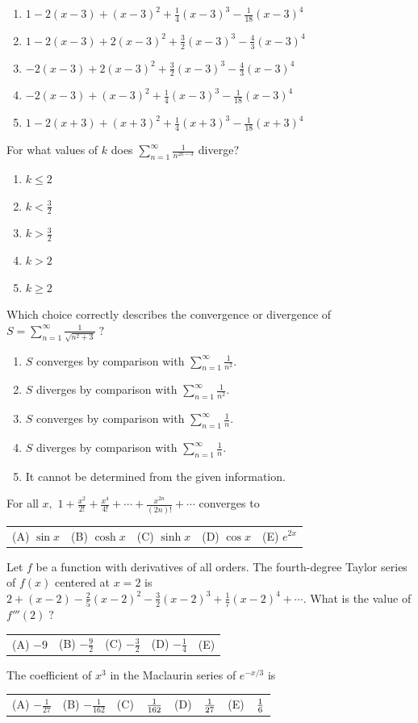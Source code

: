 \documentclass[letterstyle,12pt]{extarticle}
\newcounter{qcounter}
\newcommand{\nspace}{\hspace{2.52mm}}
\newcommand{\choices}[5]{
\vspace{0.8em} 
\begin{enumerate}[label=(\Alph*)]
\setlength\itemsep{1em} 
\item
#1 
\item 
#2
\item
#3
\item
#4
\item
#5
\end{enumerate}
}
\newcommand{\choicesline}[5]{    
\vspace{2em} \break 
\begin{tabularx}{0.95 \textwidth} { 
>{\arraybackslash}X 
>{\arraybackslash}X 
>{\arraybackslash}X 
>{\arraybackslash}X 
>{\arraybackslash}X }
(A) \; #1
& 
(B) \; #2
& 
(C) \; #3
& 
(D) \; #4
&
(E) \; #5 
\end{tabularx}
\vspace{2em} \break
}
\newcommand{\qspace}[1]{\begin{spacing}{1.8}#1\end{spacing}}
\newcommand{\ans}[1]{{\color{black} #1}}
\newenvironment{question}
    {\begin{minipage}{0.9 \textwidth}
        \item
    }
    { 
    \end{minipage} \vspace{4ex}
    }
\begin{document}
\begin{list}{\textbf{.}~}{}
\begin{question}
\choices
{\ans{\(1 -2(x - 3) + (x - 3)^2 + \frac{1}{4} (x - 3)^3 - \frac{1}{18} (x - 3)^4\)}}
{\(1 -2(x - 3) + 2(x - 3)^2 + \frac{3}{2}(x - 3)^3 - \frac{4}{3} (x - 3)^4\)}
{\(-2(x - 3) + 2(x - 3)^2 + \frac{3}{2}(x - 3)^3 - \frac{4}{3} (x - 3)^4\)}
{\(-2(x - 3) + (x - 3)^2 + \frac{1}{4} (x - 3)^3 - \frac{1}{18} (x - 3)^4\)}
{\(1 -2(x + 3) + (x + 3)^2 + \frac{1}{4} (x + 3)^3 - \frac{1}{18} (x + 3)^4\)}
\end{question}

\begin{question}
For what values of \(k\) does \(\sum_{n = 1}^\infty \frac{1}{n^{2k - 3}}\) diverge?
\choices
{\ans{\(k \leqslant 2\)}}
{\(k < \frac{3}{2}\)}
{\(k > \frac{3}{2}\)}
{\(k > 2\)}
{\(k \geqslant 2\)}
\end{question}

\begin{question}
Which choice correctly describes the convergence or divergence of \(S = \sum_{n = 1}^\infty \frac{1}{\sqrt{n^2 + 3}} \; ?\)
\choices
{\(S\) converges by comparison with \(\sum_{n = 1}^\infty \frac{1}{n^2}.\)}
{\(S\) diverges by comparison with \(\sum_{n = 1}^\infty \frac{1}{n^2}.\)}
{\(S\) converges by comparison with \(\sum_{n = 1}^\infty \frac{1}{n}.\)}
{\ans{\(S\) diverges by comparison with \(\sum_{n = 1}^\infty \frac{1}{n}.\)}}
{It cannot be determined from the given information.}
\end{question}

\begin{question}
For all \(x,\) \(1 + \frac{x^2}{2!} + \frac{x^4}{4!} + \cdots + \frac{x^{2n}}{(2n)!} + \cdots\) \; converges to \\
\choicesline
{\(\sin x\)}
{\ans{\(\cosh x\)}}
{\(\sinh x\)}
{\(\cos x\)}
{\(e^{2x}\)}
\end{question}

\begin{question}
\qspace{
Let \(f\) be a function with derivatives of all orders. The fourth-degree Taylor series of \(f(x)\) centered at \(x = 2\) is \(2 + (x - 2) - \frac{2}{5}(x - 2)^2 - \frac{3}{2} (x - 2)^3 + \frac{1}{7} (x - 2)^4 + \cdots.\) What is the value of \(f'''(2) \; ?\)}
\choicesline
{\ans{\(-9\)}}
{\(-\frac{9}{2}\)}
{\(-\frac{3}{2}\)}
{\(-\frac{1}{4}\)}
{0}
\end{question}

\begin{question}
The coefficient of \(x^3\) in the Maclaurin series of \(e^{-x/3}\) is 
\choicesline
{\(-\frac{1}{27}\)}
{\ans{\(- \frac{1}{162}\)}}
{\(\nspace \frac{1}{162}\)}
{\( \nspace \frac{1}{27}\)}
{\( \nspace \frac{1}{6}\)}
\end{question}


\end{list}
\end{document}

